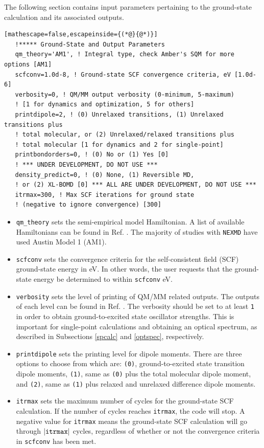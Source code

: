 \documentclass[letterpaper,12pt,titlepage]{article}
\begin{document}
The following section contains input parameters pertaining to the ground-state calculation and its associated outputs.
\begin{lstlisting}[mathescape=false,escapeinside={(*@}{@*)}]
   !***** Ground-State and Output Parameters
   qm_theory='AM1', ! Integral type, check Amber's SQM for more options [AM1]
   scfconv=1.0d-8, ! Ground-state SCF convergence criteria, eV [1.0d-6]
   verbosity=0, ! QM/MM output verbosity (0-minimum, 5-maximum) 
   ! [1 for dynamics and optimization, 5 for others]
   printdipole=2, ! (0) Unrelaxed transitions, (1) Unrelaxed transitions plus 
   ! total molecular, or (2) Unrelaxed/relaxed transitions plus 
   ! total molecular [1 for dynamics and 2 for single-point]
   printbondorders=0, ! (0) No or (1) Yes [0]
   ! *** UNDER DEVELOPMENT, DO NOT USE ***
   density_predict=0, ! (0) None, (1) Reversible MD, 
   ! or (2) XL-BOMD [0] *** ALL ARE UNDER DEVELOPMENT, DO NOT USE ***
   itrmax=300, ! Max SCF iterations for ground state 
   ! (negative to ignore convergence) [300]
\end{lstlisting}
 \begin{itemize}
\item \verb+qm_theory+ sets the semi-empirical model Hamiltonian.  A list of available Hamiltonians can be found in Ref. \cite{amber2017}.  The majority of studies with \verb+NEXMD+ have used Austin Model 1 (AM1).  
\item \verb+scfconv+ sets the convergence criteria for the self-consistent field (SCF) ground-state energy in eV. In other words, the user requests that the ground-state energy be determined to within \verb+scfconv+ eV.
\item \verb+verbosity+ sets the level of printing of QM/MM related outputs.  The outputs of each level can be found in Ref. \cite{amber2017}.  The verbosity should be set to at least \verb+1+ in order to obtain ground-to-excited state oscillator strengths.  This is important for single-point calculations and obtaining an optical spectrum, as described in Subsections \ref{spcalc} and \ref{optspec}, respectively.
\item \verb+printdipole+ sets the printing level for dipole moments.  There are three options to choose from which are: \verb+(0)+, ground-to-excited state transition dipole moments, \verb+(1)+, same as \verb+(0)+ plus the total molecular dipole moment, and \verb+(2)+, same as \verb+(1)+ plus relaxed and unrelaxed difference dipole moments.
\item \verb+itrmax+ sets the maximum number of cycles for the ground-state SCF calculation.  If the number of cycles reaches \verb+itrmax+, the code will stop.  A negative value for \verb+itrmax+ means the ground-state SCF calculation will go through $\left|\verb+itrmax+\right|$ cycles, regardless of whether or not the convergence criteria in \verb+scfconv+ has been met.
\end{itemize}
\end{document}
